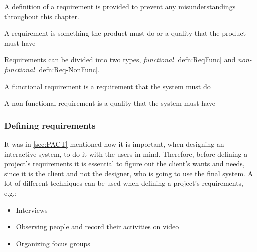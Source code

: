 A definition of a requirement is provided to prevent any misunderstandings throughout this chapter.

\begin{defn}\label{defn:Req}
    A requirement is something the product must do or a quality that the product must have
\end{defn}

Requirements can be divided into two types, \textit{functional} \cref{defn:ReqFunc} and \textit{non-functional} \cref{defn:Req-NonFunc}.

\begin{defn}\label{defn:ReqFunc}
    A functional requirement is a requirement that the system must do
\end{defn}

\begin{defn}\label{defn:Req-NonFunc}
    A non-functional requirement is a quality that the system must have
\end{defn}

\subsubsection{Defining requirements} \label{sec:requirementsdefinition}
It was in \cref{sec:PACT} mentioned how it is important, when designing an interactive system, to do it with the users in mind.
Therefore, before defining a project's requirements it is essential to figure out the client's wants and needs, since it is the client and not the designer, who is going to use the final system.
A lot of different techniques can be used when defining a project's requirements, e.g.:

\begin{itemize}
    \item Interviews
    \item Observing people and record their activities on video
    \item Organizing focus groups
\end{itemize}

